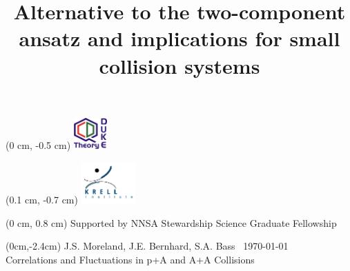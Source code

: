 \documentclass[svgnames]{beamer}
\title[]{Alternative to the two-component ansatz and implications for small collision systems}
\subtitle[Duke U.]{\vspace{0.2 in}} %
\author[]{}
\date[\today]{}
\begin{document}
\begin{frame}
\vspace{0 in}
\maketitle


\begin{textblock*}{\linewidth}(0 cm, -0.5 cm)
  \flushleft \includegraphics[height=1.2cm]{DukeQCD}
\end{textblock*}

\begin{textblock*}{\linewidth}(0.1 cm, -0.7 cm)
  \flushright \includegraphics[height=1.6cm]{Krell}
\end{textblock*}

\begin{textblock*}{\linewidth}(0 cm, 0.8 cm)
  \centering
  \tiny Supported by NNSA Stewardship Science Graduate Fellowship
\end{textblock*}


\begin{textblock*}{\linewidth}(0cm,-2.4cm)
  \centering
  \small
  J.S. Moreland, J.E. Bernhard, S.A. Bass \textbar ~\today \\
  Correlations and Fluctuations in p+A and A+A Collisions \\
  
\end{textblock*}
  
\end{frame}

\end{document}
